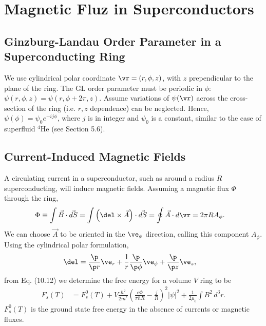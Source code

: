 \documentclass[qo.tex]{subfiles}
\begin{document}
\chapter{Magnetic Fluz in Superconductors}
\section{Ginzburg-Landau Order Parameter in a Superconducting Ring}
We use cylindrical polar coordinate $\vr=(r,\phi,z)$, with $z$ prependicular to the plane of the ring. 
The GL order parameter must be periodic in $\phi$: $\psi(r,\phi,z)=\psi(r,\phi+2\pi,z)$.
Assume variations of $\psi(\vr)$ across the cross-section of the ring (i.e. $r,z$ dependence) can be neglected.
Hence, $\psi(\phi)=\psi_0e^{-ij\phi}$, where $j$ is in integer and $\psi_0$ is a constant, similar to the case of superfluid ${}^4$He (see Section 5.6).

\section{Current-Induced Magnetic Fields}
A circulating current in a superconductor, such as around a radius $R$ superconducting, will induce magnetic fields. 
Assuming a magnetic flux $\Phi$ through the ring,
\begin{align}
    \Phi &\equiv \int \vec{B}\cdot\vec{dS} = \int \left(\del\times\vec{A}\right)\cdot\vec{dS} = \oint \vec{A}\cdot d\vr = 2\pi RA_\phi.
\end{align}
We can choose $\vec{A}$ to be oriented in the $\ve_\phi$ direction, calling this component $A_\phi$.
Using the cylindrical polar formulation,
\begin{align}
    \del &= \frac{\p}{\p r}\ve_r + \frac{1}{r}\frac{\p}{\p\phi}\ve_\phi + \frac{\p}{\p z}\ve_z,
\end{align}
from Eq. (10.12) we determine the free energy for a volume $V$ ring to be
\begin{align}
    F_s(T) &= F_s^0(T) + V\frac{\hbar^2}{2m^*}\left(\frac{e\Phi}{\pi\hbar R}-\frac{j}{R}\right)^2|\psi|^2 + \frac{1}{2\mu_0}\int B^2\,d^3r.
\end{align}
$F_s^0(T)$ is the ground state free energy in the absence of currents or magnetic fluxes.
\end{document}
